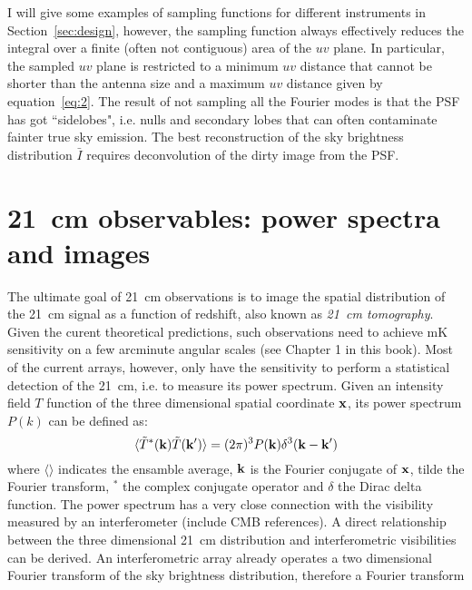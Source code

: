 I will give some examples of sampling functions for different instruments in Section~\ref{sec:design}, however, the sampling function always effectively reduces the integral over a finite (often not contiguous) area of the $uv$ plane. In particular, the sampled $uv$ plane is restricted to a minimum $uv$ distance that cannot be shorter than the antenna size and a maximum $uv$ distance given by equation~\ref{eq:2}. The result of not sampling all the Fourier modes is that the PSF has got ``sidelobes", i.e. nulls and secondary lobes that can often contaminate fainter true sky emission. The best reconstruction of the sky brightness distribution ${\bar I}$ requires deconvolution of the dirty image from the PSF. 




\section{21~cm observables: power spectra and images}
\label{sec:observables}

The ultimate goal of 21~cm observations is to image the spatial distribution of the 21~cm signal as a function of redshift, also known as {\it 21~cm tomography}. Given the curent theoretical predictions, such observations need to achieve mK sensitivity on a few arcminute angular scales (see Chapter 1 in this book). Most of the current arrays, however, only have the sensitivity to perform a statistical detection of the 21~cm, i.e. to measure its power spectrum. Given an intensity field $T$ function of the three dimensional spatial coordinate $\bf x$, its power spectrum $P(k)$ can be defined as:
\begin{equation}
\langle {\tilde T}^* ({\bf k}) {\tilde T}({\bf k'}) \rangle = (2 \pi)^3 P({\bf k}) \delta^3({\bf k} - {\bf k}')
\end{equation}
where $\langle \rangle$ indicates the ensamble average, $\bf k$ is the Fourier conjugate of $\bf x$, tilde the Fourier transform, $^*$ the complex conjugate operator and $\delta$ the Dirac delta function. The power spectrum has a very close connection with the visibility measured by an interferometer (include CMB references). A direct relationship between the three dimensional 21~cm distribution and interferometric visibilities can be derived. An interferometric array already operates a two dimensional Fourier transform of the sky brightness distribution, therefore a Fourier transform 

